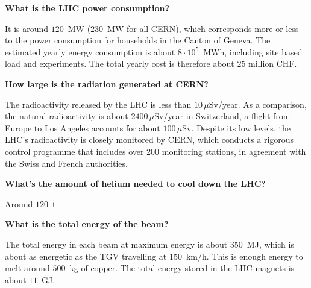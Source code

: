 \documentclass{atlasnote}
\newenvironment{question} %
{\noindent\bfseries}
{\par}
\newenvironment{answer} %
{}
{\vspace*{10pt}}
\newenvironment{faq} %
{\par\noindent\begin{minipage}{\linewidth}}
    {\end{minipage}\par}
\begin{document}
\begin{faq}
    \begin{question}
        What is the LHC power consumption?
    \end{question}
    \begin{answer}
        It is around $120$~MW ($230$~MW for all CERN), which corresponds more or less to the power consumption for households in the Canton of Geneva. The
        estimated yearly energy consumption is about $8 \cdot 10^5$~MWh, including site based load and experiments. The total yearly cost is therefore about $25$
        million CHF.
    \end{answer}
\end{faq}

\begin{faq}
    \begin{question}
        How large is the radiation generated at CERN?
    \end{question}
    \begin{answer}
        The radioactivity released by the LHC is less than $10 \, \mu$Sv/year. As a comparison, the natural radioactivity is about $2400 \, \mu$Sv/year in
        Switzerland, a flight from Europe to Los Angeles accounts for about $100 \, \mu$Sv. Despite its low levels, the LHC's radioactivity is closely monitored
        by CERN, which conducts a rigorous control programme that includes over 200 monitoring stations, in agreement with the Swiss and French authorities.
    \end{answer}
\end{faq}

\begin{faq}
    \begin{question}
        What's the amount of helium needed to cool down the LHC?
    \end{question}
    \begin{answer}
        Around $120$~t.
    \end{answer}
\end{faq}

\begin{faq}
    \begin{question}
        What is the total energy of the beam?
    \end{question}
    \begin{answer}
        The total energy in each beam at maximum energy is about $350$~MJ, which is about as energetic as the TGV travelling at $150$~km/h. This is enough
        energy to melt around $500$~kg of copper. The total energy stored in the LHC magnets is about $11$~GJ.
    \end{answer}
\end{faq}
\end{document}
